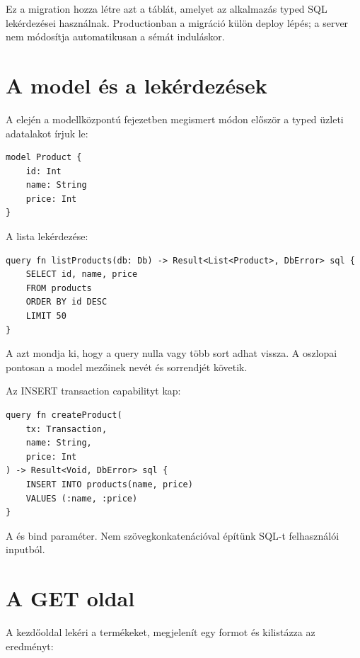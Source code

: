 Ez a migration hozza létre azt a táblát, amelyet az alkalmazás typed SQL lekérdezései használnak. Productionban a migráció külön deploy lépés; a server nem módosítja automatikusan a sémát induláskor.

\section{A model és a lekérdezések}

A  elején a modellközpontú fejezetben megismert módon először a typed üzleti adatalakot írjuk le:

\begin{lstlisting}[language=RWLang]
model Product {
    id: Int
    name: String
    price: Int
}
\end{lstlisting}

A lista lekérdezése:

\begin{lstlisting}[language=RWLang]
query fn listProducts(db: Db) -> Result<List<Product>, DbError> sql {
    SELECT id, name, price
    FROM products
    ORDER BY id DESC
    LIMIT 50
}
\end{lstlisting}

A  azt mondja ki, hogy a query nulla vagy több  sort adhat vissza. A  oszlopai pontosan a model mezőinek nevét és sorrendjét követik.

Az INSERT transaction capabilityt kap:

\begin{lstlisting}[language=RWLang]
query fn createProduct(
    tx: Transaction,
    name: String,
    price: Int
) -> Result<Void, DbError> sql {
    INSERT INTO products(name, price)
    VALUES (:name, :price)
}
\end{lstlisting}

A  és  bind paraméter. Nem szövegkonkatenációval építünk SQL-t felhasználói inputból.

\section{A GET oldal}

A kezdőoldal lekéri a termékeket, megjelenít egy formot és kilistázza az eredményt:

